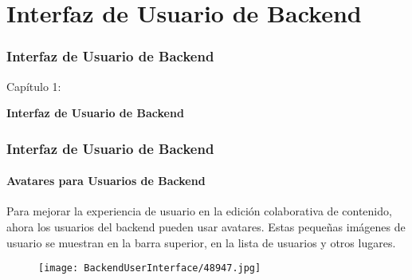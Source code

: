 %

\section{Interfaz de Usuario de Backend}
\begin{frame}[fragile]
	\frametitle{Interfaz de Usuario de Backend}

	\begin{center}\huge{Capítulo 1:}\end{center}
	\begin{center}\huge{\color{typo3darkgrey}\textbf{Interfaz de Usuario de Backend}}\end{center}

\end{frame}

\begin{frame}[fragile]
	\frametitle{Interfaz de Usuario de Backend}
	\framesubtitle{Avatares para Usuarios de Backend}

	Para mejorar la experiencia de usuario en la edición colaborativa de contenido, ahora los usuarios del backend pueden usar avatares.
	Estas pequeñas imágenes de usuario se muestran en la barra superior, en la lista de usuarios y otros lugares.

	\begin{figure}
		\texttt{[image: BackendUserInterface/48947.jpg]}
	\end{figure}

\end{frame}

